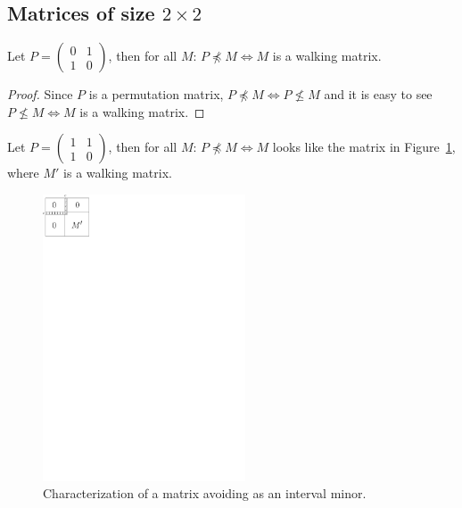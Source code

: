 \documentclass[12pt,a4paper]{report}
\begin{document}
\subsection{Matrices of size $2\times2$}
\begin{thm}
Let $P=\left(\begin{smallmatrix}0&1\\1&0\end{smallmatrix}\right)$, then for all $M$: $P\not\preceq M\Leftrightarrow M$ is a walking matrix.
\end{thm}
\begin{proof}
Since $P$ is a permutation matrix, $P\not\preceq M\Leftrightarrow P\not\leq M$ and it is easy to see $P\not\leq M\Leftrightarrow M$ is a walking matrix.
\end{proof}
\begin{thm}
\label{theorem1}
Let $P=\left(\begin{smallmatrix}1&1\\1&0\end{smallmatrix}\right)$, then for all $M$: $P\not\preceq M\Leftrightarrow M$ looks like the matrix in Figure~\ref{p21}, where $M'$ is a walking matrix.
\end{thm}
\begin{figure}[h!]
\centering
\includegraphics[width=60mm]{img/p21.pdf}
\caption{Characterization of a matrix avoiding \usebox{\smlmat} as an interval minor.}
\label{p21}
\end{figure}
\end{document}
